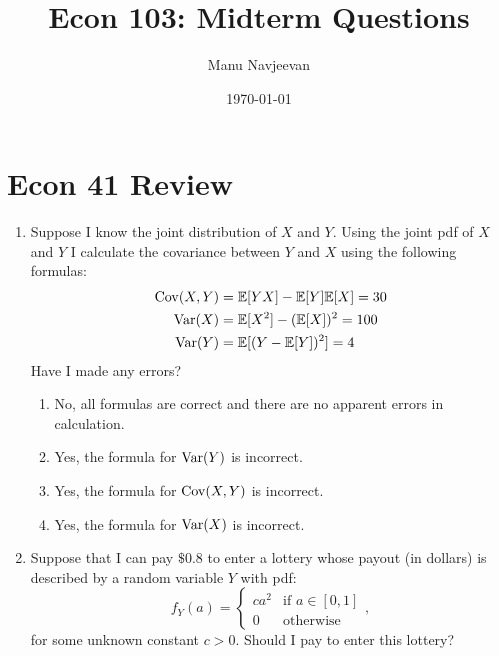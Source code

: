 \documentclass[10pt]{article}
\title{Econ 103: Midterm Questions} %
\author{Manu Navjeevan}
\date{\today}
\begin{document}
\maketitle


\section{Econ 41 Review}%
\label{sec:econ41review}

\begin{enumerate}
	\item Suppose I know the joint distribution of \(X\) and  \(Y\). Using the joint pdf of \(X\) and  \(Y\) I calculate the covariance between  \(Y\) and  \(X\) using the following formulas:
	\begin{align*}
		\operatorname{Cov}(X,Y) &= \mathbb{E}[YX] - \mathbb{E}[Y]\mathbb{E}[X] = 30 \\
		\operatorname{Var}(X) &= \mathbb{E}[X^2] - (\mathbb{E}[X])^2 = 100 \\
		\operatorname{Var}(Y) &= \mathbb{E}[(Y- \mathbb{E}[Y])^2] = 4
	\end{align*}
	Have I made any errors?
	\begin{enumerate}
		\item No, all formulas are correct and there are no apparent errors in calculation.
		\item Yes, the formula for \(\operatorname{Var}(Y)\) is incorrect. 
		\item Yes, the formula for \(\operatorname{Cov}(X,Y)\) is incorrect.
		\item Yes, the formula for \(\operatorname{Var}(X)\) is incorrect. 
	\end{enumerate}
	 
	\item Suppose that I can pay \(\$0.8\) to enter a lottery whose payout (in dollars) is described by a random variable \(Y\) with pdf:
	\[
		f_Y(a) = \begin{cases}
			ca^2 & \text{if } a \in [0,1]\\
			0 &\text{otherwise}
		\end{cases},
	\]
	for some unknown constant \(c > 0\). Should I pay to enter this lottery?

\end{enumerate}
\end{document}
